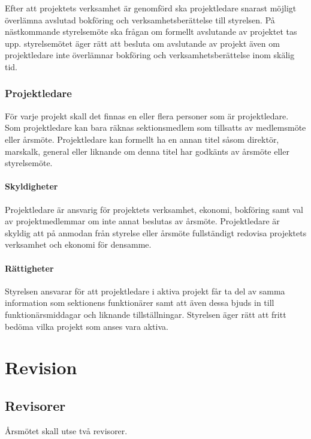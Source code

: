\documentclass{dgovdoc}
\begin{document}
Efter att projektets verksamhet är genomförd ska projektledare snarast möjligt
överlämna avslutad bokföring och verksamhetsberättelse till styrelsen.
På nästkommande styrelsemöte ska frågan om formellt avslutande av projektet tas upp.
styrelsemötet äger rätt att besluta om avslutande av projekt även om projektledare inte
överlämnar bokföring och verksamhetsberättelse inom skälig tid.

\subsubsection{Projektledare}

För varje projekt skall det finnas en eller flera personer som är
projektledare. Som projektledare kan bara räknas sektionsmedlem som tillsatts
av medlemsmöte eller årsmöte. Projektledare kan formellt ha en annan titel såsom direktör, marskalk,
general eller liknande om denna titel har godkänts av årsmöte eller styrelsemöte.

\paragraph{Skyldigheter}

Projektledare är ansvarig för projektets verksamhet, ekonomi, bokföring samt
val av projektmedlemmar om inte annat beslutas av årsmöte. Projektledare är
skyldig att på anmodan från styrelse eller årsmöte fullständigt redovisa
projektets verksamhet och ekonomi för densamme.

\paragraph{Rättigheter}

Styrelsen ansvarar för att projektledare i aktiva projekt får ta del av
samma information som sektionens funktionärer samt att även dessa bjuds
in till funktionärsmiddagar och liknande tillställningar. Styrelsen äger
rätt att fritt bedöma vilka projekt som anses vara aktiva.

\section{Revision}

\subsection{Revisorer}
\label{sec:revisorer}

Årsmötet skall utse två revisorer.
\end{document}
